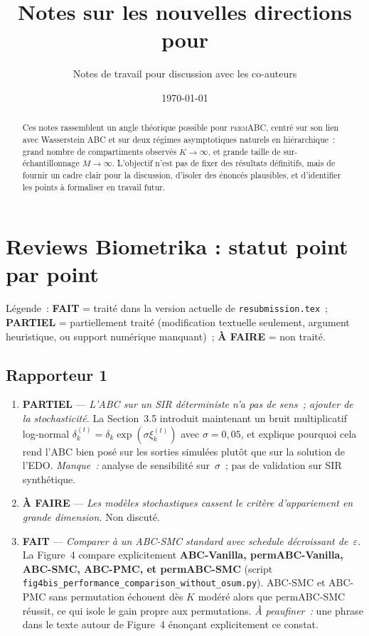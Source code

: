 \documentclass[11pt]{article}
\title{Notes sur les nouvelles directions pour \permABC}
\author{Notes de travail pour discussion avec les co-auteurs}
\date{\today}
\newcommand{\permABC}{\textsc{permABC}}
\begin{document}
\maketitle

\begin{abstract}
Ces notes rassemblent un angle théorique possible pour \permABC, centré sur son lien avec
Wasserstein ABC et sur deux régimes asymptotiques naturels en hiérarchique~:
grand nombre de compartiments observés $K \to \infty$, et grande taille de sur-échantillonnage
$M \to \infty$. L'objectif n'est pas de fixer des résultats définitifs, mais de fournir un cadre
clair pour la discussion, d'isoler des énoncés plausibles, et d'identifier les points à
formaliser en travail futur.
\end{abstract}

\tableofcontents

\section{Reviews Biometrika : statut point par point}
\label{sec:biometrika_status}

Légende~:
\textcolor{green!55!black}{\textbf{FAIT}} = traité dans la version actuelle de
\texttt{resubmission.tex}~;
\textcolor{orange!85!black}{\textbf{PARTIEL}} = partiellement traité (modification textuelle
seulement, argument heuristique, ou support numérique manquant)~;
\textcolor{red!70!black}{\textbf{À FAIRE}} = non traité.

\subsection*{Rapporteur 1}
\begin{enumerate}[leftmargin=*]
    \item \textcolor{orange!85!black}{\textbf{PARTIEL}} --- \emph{L'ABC sur un SIR déterministe n'a
    pas de sens~; ajouter de la stochasticité.}
    La Section~3.5 introduit maintenant un bruit multiplicatif log-normal
    $\delta_k^{(t)} = \delta_k \exp(\sigma\xi_k^{(t)})$ avec $\sigma=0,05$, et explique pourquoi
    cela rend l'ABC bien posé sur les sorties simulées plutôt que sur la solution de l'EDO.
    \emph{Manque~:} analyse de sensibilité sur~$\sigma$~; pas de validation sur SIR synthétique.
    \item \textcolor{red!70!black}{\textbf{À FAIRE}} --- \emph{Les modèles stochastiques cassent le
    critère d'appariement en grande dimension.} Non discuté.
    \item \textcolor{green!55!black}{\textbf{FAIT}} --- \emph{Comparer à un ABC-SMC standard avec
    schedule décroissant de~$\varepsilon$.} La Figure~4 compare explicitement
    \textbf{ABC-Vanilla, permABC-Vanilla, ABC-SMC, ABC-PMC, et permABC-SMC} (script
    \texttt{fig4bis\_performance\_comparison\_without\_osum.py}). ABC-SMC et ABC-PMC sans
    permutation échouent dès $K$ modéré alors que permABC-SMC réussit, ce qui isole le gain
    propre aux permutations. \emph{À peaufiner~:} une phrase dans le texte autour de Figure~4
    énonçant explicitement ce constat.
\end{enumerate}
\end{document}

